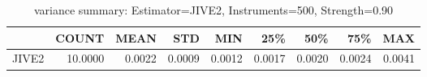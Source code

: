 \begin{table}[ht]
\centering
\caption{variance summary: Estimator=JIVE2, Instruments=500, Strength=0.90}
\begin{tabular}{lrrrrrrrr}
\toprule
 & COUNT & MEAN & STD & MIN & 25\% & 50\% & 75\% & MAX \\
\midrule
JIVE2 & 10.0000 & 0.0022 & 0.0009 & 0.0012 & 0.0017 & 0.0020 & 0.0024 & 0.0041 \\
\bottomrule
\end{tabular}
\end{table}
